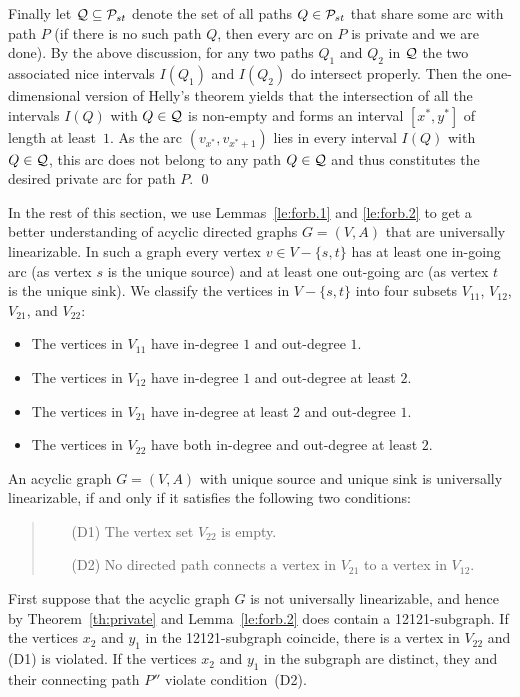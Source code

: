 Finally let ${\cal Q}\subseteq{\cal P}_{st}$ denote the set of all paths $Q\in{\cal P}_{st}$ that share some arc with path $P$
(if there is no such path $Q$, then every arc on $P$ is private and we are done).
By the above discussion, for any two paths $Q_1$ and $Q_2$ in ${\cal Q}$ the two associated nice 
intervals $I(Q_1)$ and $I(Q_2)$ do intersect properly.
Then the one-dimensional version of Helly's theorem \cite{Helly1923} yields that the intersection of all the 
intervals $I(Q)$ with $Q\in{\cal Q}$ is non-empty and forms an interval $[x^*,y^*]$ of length at least~$1$.
As the arc $(v_{x^*},v_{x^*+1})$ lies in every interval $I(Q)$ with $Q\in{\cal Q}$, this arc does 
not belong to any path $Q\in{\cal Q}$ and thus constitutes the desired private arc for path $P$.
\qed

\bigskip
In the rest of this section, we use Lemmas~\ref{le:forb.1} and \ref{le:forb.2} to get a better 
understanding of acyclic directed graphs $G=(V,A)$ that are universally linearizable.
In such a graph every vertex $v\in V-\{s,t\}$ has at least one in-going arc (as vertex $s$ is the 
unique source) and at least one out-going arc (as vertex $t$ is the unique sink).
We classify the vertices in $V-\{s,t\}$ into four subsets $V_{11}$, $V_{12}$, $V_{21}$, and $V_{22}$:
\begin{itemize}
\item The vertices in $V_{11}$ have in-degree $1$ and out-degree $1$.
\item The vertices in $V_{12}$ have in-degree $1$ and out-degree at least $2$.
\item The vertices in $V_{21}$ have in-degree at least $2$ and out-degree $1$.
\item The vertices in $V_{22}$ have both in-degree and out-degree at least $2$.
\end{itemize}
\begin{lemma}
\label{le:D1D2}
An acyclic graph $G=(V,A)$ with unique source and unique sink is universally linearizable, 
if and only if it satisfies the following two conditions:
\begin{quote}
\begin{itemize}
\item[(D1)] The vertex set $V_{22}$ is empty.
\item[(D2)] No directed path connects a vertex in $V_{21}$ to a vertex in $V_{12}$.
\end{itemize}
\end{quote}
\end{lemma}
\proof
First suppose that the acyclic graph $G$ is not universally linearizable, and hence 
by Theorem~\ref{th:private} and Lemma~\ref{le:forb.2} does contain a 12121-subgraph.
If the vertices $x_2$ and $y_1$ in the 12121-subgraph coincide, there is a vertex in $V_{22}$
and (D1) is violated.
If the vertices $x_2$ and $y_1$ in the subgraph are distinct, they and their connecting
path $P''$ violate condition~(D2).

